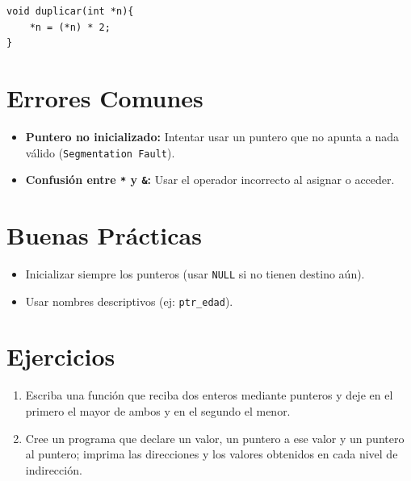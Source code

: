 \documentclass[12pt,a4paper]{article}
\begin{document}
\begin{lstlisting}
void duplicar(int *n){
    *n = (*n) * 2;
}
\end{lstlisting}

\section{Errores Comunes}
\begin{itemize}
    \item \textbf{Puntero no inicializado:} Intentar usar un puntero que no apunta a nada válido (\texttt{Segmentation Fault}).
    \item \textbf{Confusión entre \texttt{*} y \texttt{\&}:} Usar el operador incorrecto al asignar o acceder.
\end{itemize}

\section{Buenas Prácticas}
\begin{itemize}
    \item Inicializar siempre los punteros (usar \texttt{NULL} si no tienen destino aún).
    \item Usar nombres descriptivos (ej: \texttt{ptr\_edad}).
\end{itemize}

\section{Ejercicios}
\begin{enumerate}
    \item Escriba una función que reciba dos enteros mediante punteros y deje en el primero el mayor de ambos y en el segundo el menor.
    \item Cree un programa que declare un valor, un puntero a ese valor y un puntero al puntero; imprima las direcciones y los valores obtenidos en cada nivel de indirección.
\end{enumerate}
\end{document}
